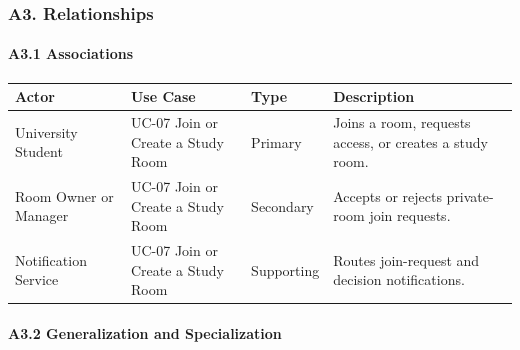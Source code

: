 \documentclass[12pt]{article}
\renewcommand{\baselinestretch}{1.5}
\begin{document}
\hypertarget{sec:a3-relationships}{}
\subsubsection*{A3. Relationships}
\par\medskip

\hypertarget{sec:a3-1-associations}{}
\paragraph*{A3.1 Associations}
\par\medskip

\begingroup
\small
\renewcommand{\baselinestretch}{1.0}\selectfont
\renewcommand{\arraystretch}{1.15}
\setlength{\tabcolsep}{6pt}
\begin{longtable}{|>{\raggedright\arraybackslash}p{}|>{\raggedright\arraybackslash}p{}|>{\raggedright\arraybackslash}p{}|>{\raggedright\arraybackslash}p{}|}
\hline
\textbf{Actor} & \textbf{Use Case} & \textbf{Type} & \textbf{Description} \\ \hline
\endhead
University Student & UC-07 Join or Create a Study Room & Primary & Joins a room, requests access, or creates a study room. \\ \hline
Room Owner or Manager & UC-07 Join or Create a Study Room & Secondary & Accepts or rejects private-room join requests. \\ \hline
Notification Service & UC-07 Join or Create a Study Room & Supporting & Routes join-request and decision notifications. \\ \hline
\end{longtable}
\endgroup
\par\medskip

\hypertarget{sec:a3-2-generalization-and-specialization}{}
\paragraph*{A3.2 Generalization and Specialization}
\par\medskip
\end{document}
